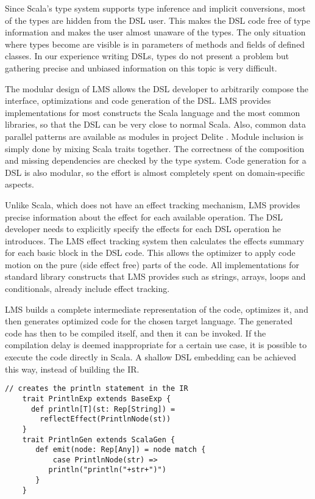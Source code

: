 Since Scala's type system supports type inference and implicit conversions, most of the  types are hidden from the DSL user. This makes the DSL code free of type information and makes the user almost unaware of the  types. The only situation where  types become are visible is in parameters of methods and fields of defined classes. In our experience writing DSLs,  types do not present a problem but gathering precise and unbiased information on this topic is very difficult.  

The modular design of LMS allows the DSL developer to arbitrarily compose the
interface, optimizations and code generation of the DSL. LMS provides
implementations for most constructs the Scala language and the most common libraries, so that the DSL can be very close to normal Scala. Also, common data parallel patterns are available as modules in project Delite \cite{dsl11}. Module inclusion is simply done by mixing Scala traits together. The correctness of the composition and missing dependencies are checked by the type system. Code generation for a DSL is also modular, so the effort is almost completely spent on domain-specific aspects.

Unlike Scala, which does not have an effect tracking mechanism, LMS provides precise information about the effect for each available operation. The DSL developer needs to explicitly specify the effects for each DSL operation he introduces. The LMS effect tracking system then calculates the effects summary for each basic block in the DSL code. This allows the optimizer to apply code motion on the pure (side effect free) parts of the code. All implementations for standard library constructs that LMS provides such as strings, arrays, loops and conditionals, already include effect tracking.

LMS builds a complete intermediate representation of the code, optimizes it, and then generates optimized code for the chosen target language. The generated code has then to be compiled itself, and then it can be invoked. If the compilation delay is deemed inappropriate for a certain use case, it is possible to execute the code directly in Scala. A shallow DSL embedding can be achieved this way, instead of building the IR.

\begin{lstlisting}[name=code, caption=Example of how the DSL module is specified. This module is used for measuring a performance of a block of code and can be reused in any other Scala backed DSL. ,captionpos=b, label=lst:println_dsl, float=t]
    // creates the println statement in the IR
    trait PrintlnExp extends BaseExp {
      def println[T](st: Rep[String]) =
        reflectEffect(PrintlnNode(st)) 
    }
    trait PrintlnGen extends ScalaGen {
       def emit(node: Rep[Any]) = node match {
           case PrintlnNode(str) =>
	      println("println("+str+")")
       }
    }
\end{lstlisting}

